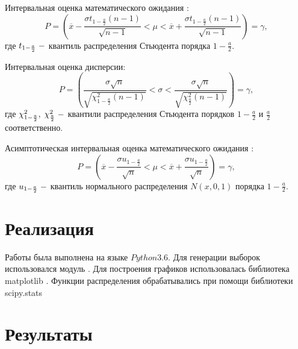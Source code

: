 \documentclass[a4]{article}
\begin{document}
	Интервальная оценка математического ожидания :
	\begin{equation}
	    P=\left(\overline{x}-\frac{\sigma t_{1-\frac{a}{2}}(n-1)}{\sqrt{n-1}}<\mu<\overline{x}+\frac{\sigma t_{1-\frac{a}{2}}(n-1)}{\sqrt{n-1}}\right) = \gamma,
	\end{equation}
	где $t_{1-\frac{a}{2}}\;\--$ квантиль распределения Стьюдента порядка $1-\frac{a}{2}.$

	Интервальная оценка дисперсии:
	\begin{equation}
	    P=\left(\frac{\sigma\sqrt{n}}{\sqrt{\chi^2_{1-\frac{a}{2}}(n-1)}}<\sigma<\frac{\sigma\sqrt{n}}{\sqrt{\chi^2_\frac{a}{2}(n-1)}}\right) = \gamma,
	\end{equation}
	где $\chi_{1-\frac{a}{2}}^2,\;\chi_\frac{a}{2}^2\;\--$ квантили распределения Стьюдента порядков $1-\frac{a}{2}$ и $\frac{a}{2}$ соответственно.

	Асимптотическая интервальная оценка математического ожидания :
	\begin{equation}
	    P = \left(\overline{x}-\frac{\sigma u_{1-\frac{a}{2}}}{\sqrt{n}}<\mu<\overline{x}+\frac{\sigma u_{1-\frac{a}{2}}}{\sqrt{n}}\right)=\gamma,
	\end{equation}
	где $u_{1-\frac{a}{2}}\;\--$ квантиль нормального распределения $N(x,0,1)$ порядка $1-\frac{a}{2}.$
	\section{Реализация} %
	\label{sec:реализация}
	Работы была выполнена на языке $Python 3.6.$
	Для генерации выборок использовался модуль \cite{numpy}.
	Для построения графиков использовалась библиотека matplotlib \cite{plotlib}.
	Функции распределения обрабатывались при помощи библиотеки scipy.stats \cite{skp}
\section{Результаты} %
\label{sec:результаты}
\end{document}
